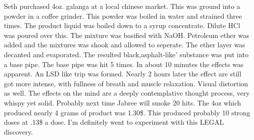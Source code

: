 \documentclass[12pt]{book}
\begin{document}
Seth purchased 4oz. galanga at a local chinese market. This was ground into a powder in a coffee grinder. This powder was boiled in water and strained three times. The product liquid was boiled down to a syrup concentrate. Dilute HCl was poured over this. The mixture was basified with NaOH. Petroleum ether was added and the mixtures was shook and allowed to seperate. The ether layer was decanted and evaporated. The resulted black,asphalt-like' substance was put into a base pipe. The base pipe was hit 5 times. In about 10 minutes the effects was apparent. An LSD like trip was formed. Nearly 2 hours later the effect are still got more intense, with fullness of breath and muscle relaxation. Visual distortion as well. The effects on the mind are a deeply contemplative thought process, very whispy yet solid. Probably next time Jabree will smoke 20 hits. The 4oz which produced nearly 4 grams of product was 1.30\$. This produced probably 10 strong doses at .13\$ a dose. I'm definitely went to experiment with this LEGAL discovery.
\end{document}
